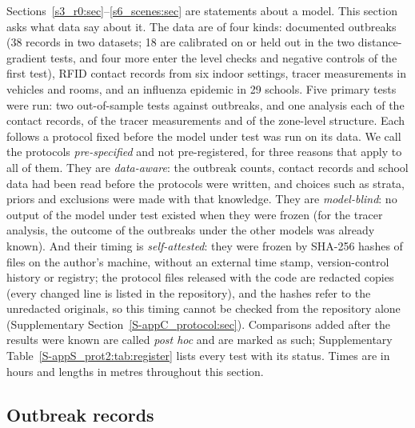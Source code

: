 Sections~\ref{s3_r0:sec}--\ref{s6_scenes:sec} are statements about a model. This section asks what data say about
it. The data are of four kinds: documented outbreaks (38 records in two datasets; 18 are calibrated on or held out in the two distance-gradient tests, and four
more enter the level checks and negative controls of the first test), RFID
contact records from six indoor settings, tracer measurements in vehicles and rooms, and an influenza epidemic in
29 schools. Five primary tests were run: two out-of-sample tests against outbreaks, and one analysis each of the
contact records, of the tracer measurements and of the zone-level structure. Each follows a protocol fixed
before the model under test was run on its data. We call the protocols \emph{pre-specified} and not
pre-registered, for three reasons that apply to all of them. They are \emph{data-aware}: the outbreak counts,
contact records and school data had been read before the protocols were written, and choices such as strata,
priors and exclusions were made with that knowledge. They are \emph{model-blind}: no output of the model under
test existed when they were frozen (for the tracer analysis, the outcome of the outbreaks under the other models
was already known). And their timing is \emph{self-attested}: they were frozen by SHA-256 hashes of files on the
author's machine, without an external time stamp, version-control history or registry; the protocol files
released with the code are redacted copies (every changed line is listed in the repository), and the hashes refer
to the unredacted originals, so this timing cannot be checked from the repository alone (Supplementary
Section~\ref{S-appC_protocol:sec}). Comparisons added after
the results were known are called \emph{post hoc} and are marked as such; Supplementary
Table~\ref{S-appS_prot2:tab:register} lists every test with its status. Times are in hours and lengths in metres
throughout this section.

\subsection{Outbreak records}\label{s8_outbreaks:sec:dataset}

